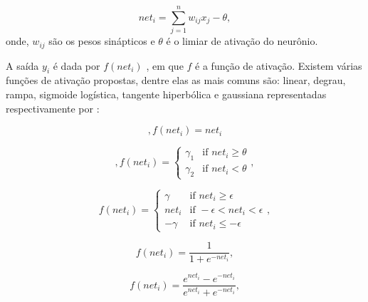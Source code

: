 \begin{equation}
\label{eq:net}
net_i = \sum_{j=1}^{n} w_{ij}x_j - \theta  , 
\end{equation}
onde, $w_{ij}$ são os pesos sinápticos e $\theta$ é o limiar de ativação do neurônio.

A saída $y_i$ é dada por $f(net_i)$ \label{symbol:funcaoativacaoneuron}, em que $f$ é a função de ativação. Existem várias funções de ativação propostas, dentre elas as mais comuns são: linear, degrau, rampa, sigmoide logística, tangente hiperbólica e gaussiana representadas respectivamente por \cite{valenca2005aplicando} \cite{engelbrecht2007computational}:

\begin{equation}
\label{eq:linear_activation},
f(net_i) = net_i
\end{equation}

\begin{equation}
\label{eq:step_activation},
f(net_i) = 
\begin{cases}
    \gamma_1 & \text{if } net_i \geq \theta \\
    \gamma_2 & \text{if } net_i < \theta
\end{cases},
\end{equation}

\begin{equation}
\label{eq:ramp_activation}
f(net_i) = 
\begin{cases}
    \gamma & \text{if } net_i \geq \epsilon \\
    net_i & \text{if } -\epsilon < net_i < \epsilon \\
    -\gamma & \text{if } net_i \leq -\epsilon
\end{cases},
\end{equation}

\begin{equation}
\label{eq:logisticsigmoid_activation}
f(net_i) = \frac{1}{1 + e^{-net_i}},
\end{equation}

\begin{equation}
\label{eq:hiberbolictangent_activation}
f(net_i) = \frac{e^{net_i} - e^{-net_i}}{e^{net_i} + e^{-net_i}},
\end{equation}


